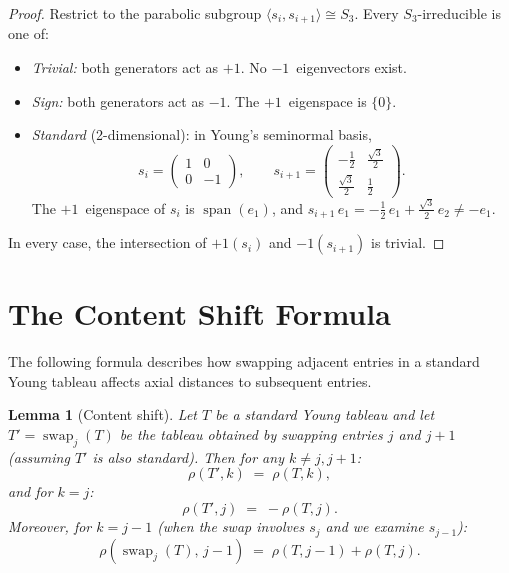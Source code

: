 \documentclass[12pt]{article}
\newtheorem{lemma}[theorem]{Lemma}
\theoremstyle{definition}
\theoremstyle{remark}
\begin{document}
\begin{proof}
Restrict to the parabolic subgroup $\langle s_i, s_{i+1} \rangle \cong S_3$.
Every $S_3$-irreducible is one of:

\begin{itemize}
\item \emph{Trivial:} both generators act as $+1$.  No $-1$~eigenvectors exist.
\item \emph{Sign:} both generators act as $-1$.  The $+1$~eigenspace is $\{0\}$.
\item \emph{Standard} (2-dimensional):  in Young's seminormal basis,
  \[
    s_i = \begin{pmatrix} 1 & 0 \\ 0 & -1 \end{pmatrix}, \qquad
    s_{i+1} = \begin{pmatrix} -\tfrac12 & \tfrac{\sqrt3}{2} \\[2pt]
    \tfrac{\sqrt3}{2} & \tfrac12 \end{pmatrix}.
  \]
  The $+1$~eigenspace of $s_i$ is $\operatorname{span}(e_1)$, and
  $s_{i+1}\, e_1 = -\tfrac12\, e_1 + \tfrac{\sqrt3}{2}\, e_2 \neq -e_1$.
\end{itemize}
In every case, the intersection of $+1(s_i)$ and $-1(s_{i+1})$ is trivial.
\end{proof}

\section{The Content Shift Formula}

The following formula describes how swapping adjacent entries in a standard
Young tableau affects axial distances to subsequent entries.

\begin{lemma}[Content shift]
\label{lem:content-shift}
Let $T$ be a standard Young tableau and let $T' = \operatorname{swap}_j(T)$ be the
tableau obtained by swapping entries $j$ and $j+1$ (assuming $T'$ is also standard).
Then for any $k \neq j, j+1$:
\[
  \rho(T', k) \;=\; \rho(T, k),
\]
and for $k = j$:
\[
  \rho(T', j) \;=\; -\rho(T, j).
\]
Moreover, for $k = j - 1$ (when the swap involves $s_j$ and we examine $s_{j-1}$):
\[
  \rho(\operatorname{swap}_j(T),\, j-1) \;=\; \rho(T, j-1) + \rho(T, j).
\]
\end{lemma}
\end{document}
